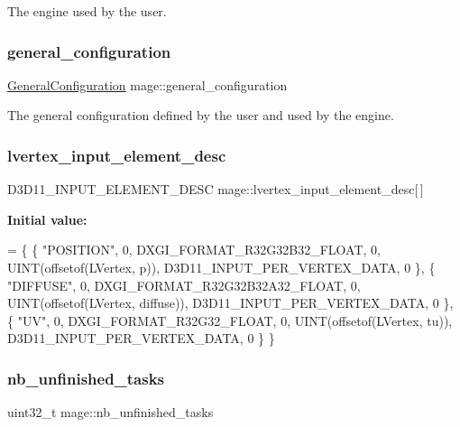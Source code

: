 The engine used by the user. \hypertarget{namespacemage_a1f4290d574030d412ca0f2f51b1a2057}{}\label{namespacemage_a1f4290d574030d412ca0f2f51b1a2057} 
\subsubsection{\texorpdfstring{general\+\_\+configuration}{general\_configuration}}
{\footnotesize\ttfamily \hyperlink{structmage_1_1_general_configuration}{General\+Configuration} mage\+::general\+\_\+configuration}

The general configuration defined by the user and used by the engine. \hypertarget{namespacemage_a1a0bf329bff9193febe0c16632c62d1b}{}\label{namespacemage_a1a0bf329bff9193febe0c16632c62d1b} 
\subsubsection{\texorpdfstring{lvertex\+\_\+input\+\_\+element\+\_\+desc}{lvertex\_input\_element\_desc}}
{\footnotesize\ttfamily D3\+D11\+\_\+\+I\+N\+P\+U\+T\+\_\+\+E\+L\+E\+M\+E\+N\+T\+\_\+\+D\+E\+SC mage\+::lvertex\+\_\+input\+\_\+element\+\_\+desc\mbox{[}$\,$\mbox{]}}

{\bfseries Initial value\+:}
\begin{DoxyCode}
= \{
        \{ \textcolor{stringliteral}{"POSITION"}, 0, DXGI\_FORMAT\_R32G32B32\_FLOAT, 0, UINT(offsetof(LVertex, p)), 
      D3D11\_INPUT\_PER\_VERTEX\_DATA, 0 \},
        \{ \textcolor{stringliteral}{"DIFFUSE"}, 0, DXGI\_FORMAT\_R32G32B32A32\_FLOAT, 0, UINT(offsetof(LVertex, diffuse)), 
      D3D11\_INPUT\_PER\_VERTEX\_DATA, 0 \},
        \{ \textcolor{stringliteral}{"UV"}, 0, DXGI\_FORMAT\_R32G32\_FLOAT, 0, UINT(offsetof(LVertex, tu)), D3D11\_INPUT\_PER\_VERTEX\_DATA, 0
       \}
    \}
\end{DoxyCode}
\hypertarget{namespacemage_a390e8652d67667609daf3aa64e3c00a8}{}\label{namespacemage_a390e8652d67667609daf3aa64e3c00a8} 
\subsubsection{\texorpdfstring{nb\+\_\+unfinished\+\_\+tasks}{nb\_unfinished\_tasks}}
{\footnotesize\ttfamily uint32\+\_\+t mage\+::nb\+\_\+unfinished\+\_\+tasks\hspace{0.3cm}{\ttfamily [static]}}

